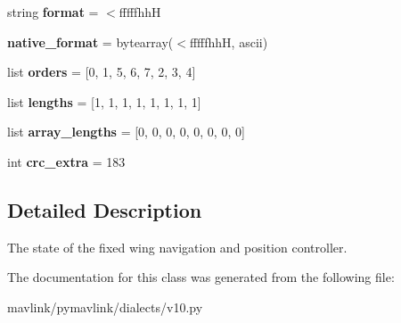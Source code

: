 \begin{DoxyCompactItemize}
\item 
\mbox{\label{classpymavlink_1_1dialects_1_1v10_1_1MAVLink__nav__controller__output__message_aea8725b82f9f64286df8e6adb32be2ef}} 
string {\bfseries format} = \textquotesingle{}$<$fffffhhH\textquotesingle{}
\item 
\mbox{\label{classpymavlink_1_1dialects_1_1v10_1_1MAVLink__nav__controller__output__message_a07de32f223a3c1b0db10d30b8d976447}} 
{\bfseries native\+\_\+format} = bytearray(\textquotesingle{}$<$fffffhhH\textquotesingle{}, \textquotesingle{}ascii\textquotesingle{})
\item 
\mbox{\label{classpymavlink_1_1dialects_1_1v10_1_1MAVLink__nav__controller__output__message_a8f4a2c557bb5a86e2ea9d58c45506d30}} 
list {\bfseries orders} = \mbox{[}0, 1, 5, 6, 7, 2, 3, 4\mbox{]}
\item 
\mbox{\label{classpymavlink_1_1dialects_1_1v10_1_1MAVLink__nav__controller__output__message_a2c67c7622abba2c57c0f3d46cf8eb9a7}} 
list {\bfseries lengths} = \mbox{[}1, 1, 1, 1, 1, 1, 1, 1\mbox{]}
\item 
\mbox{\label{classpymavlink_1_1dialects_1_1v10_1_1MAVLink__nav__controller__output__message_a2fdeab96ac2ffdcf8582e14f1e16a26c}} 
list {\bfseries array\+\_\+lengths} = \mbox{[}0, 0, 0, 0, 0, 0, 0, 0\mbox{]}
\item 
\mbox{\label{classpymavlink_1_1dialects_1_1v10_1_1MAVLink__nav__controller__output__message_adce98d2000822c50ff8b75e70666fbaf}} 
int {\bfseries crc\+\_\+extra} = 183
\end{DoxyCompactItemize}


\subsection{Detailed Description}
\begin{DoxyVerb}The state of the fixed wing navigation and position
controller.
\end{DoxyVerb}
 

The documentation for this class was generated from the following file\+:\begin{DoxyCompactItemize}
\item 
mavlink/pymavlink/dialects/v10.\+py\end{DoxyCompactItemize}
